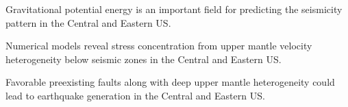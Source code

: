 \documentclass[draft,linenumbers]{agujournal2018}
\begin{document}



\begin{keypoints}
\item Gravitational potential energy is an important field for predicting the seismicity pattern in the Central and Eastern US.
\item Numerical models reveal stress concentration from upper mantle velocity heterogeneity below seismic zones in the Central and Eastern US.
\item Favorable preexisting faults along with deep upper mantle  heterogeneity could lead to earthquake generation in the Central and Eastern US.
\end{keypoints}

%
%

\end{document}
